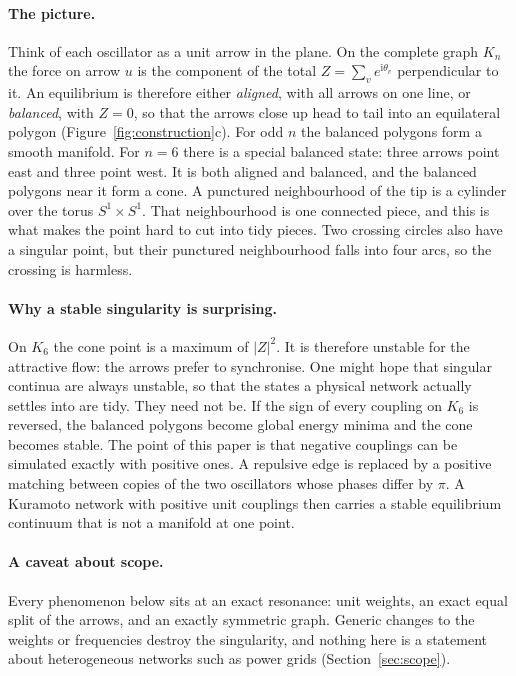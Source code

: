 \documentclass[11pt,a4paper]{article}
\theoremstyle{definition}\newtheorem{conjecture}{Conjecture}
\theoremstyle{remark}\newtheorem{remark}[theorem]{Remark}
\newcommand{\ii}{\mathrm{i}}
\begin{document}
\paragraph{The picture.} Think of each oscillator as a unit arrow in the plane. On the complete graph $K_n$ the force on arrow $u$ is the component of the total $Z=\sum_v e^{\ii\theta_v}$ perpendicular to it. An equilibrium is therefore either \emph{aligned}, with all arrows on one line, or \emph{balanced}, with $Z=0$, so that the arrows close up head to tail into an equilateral polygon (Figure~\ref{fig:construction}c). For odd $n$ the balanced polygons form a smooth manifold. For $n=6$ there is a special balanced state: three arrows point east and three point west. It is both aligned and balanced, and the balanced polygons near it form a cone. A punctured neighbourhood of the tip is a cylinder over the torus $S^1\times S^1$. That neighbourhood is one connected piece, and this is what makes the point hard to cut into tidy pieces. Two crossing circles also have a singular point, but their punctured neighbourhood falls into four arcs, so the crossing is harmless.

\paragraph{Why a stable singularity is surprising.} On $K_6$ the cone point is a maximum of $|Z|^2$. It is therefore unstable for the attractive flow: the arrows prefer to synchronise. One might hope that singular continua are always unstable, so that the states a physical network actually settles into are tidy. They need not be. If the sign of every coupling on $K_6$ is reversed, the balanced polygons become global energy minima and the cone becomes stable. The point of this paper is that negative couplings can be simulated exactly with positive ones. A repulsive edge is replaced by a positive matching between copies of the two oscillators whose phases differ by $\pi$. A Kuramoto network with positive unit couplings then carries a stable equilibrium continuum that is not a manifold at one point.

\paragraph{A caveat about scope.} Every phenomenon below sits at an exact resonance: unit weights, an exact equal split of the arrows, and an exactly symmetric graph. Generic changes to the weights or frequencies destroy the singularity, and nothing here is a statement about heterogeneous networks such as power grids (Section~\ref{sec:scope}).
\end{document}
